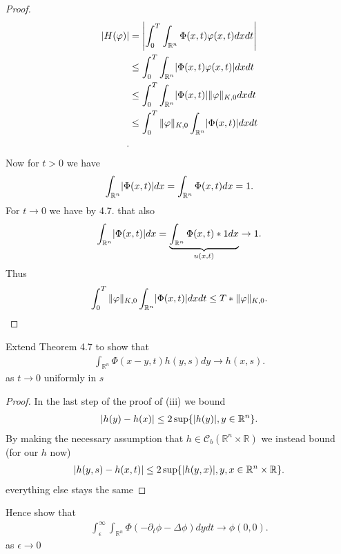 \begin{proof}
 \begin{align*}
   \abs{H(\phi )}  &= \abs*{\int_{0}^{T}  \int_{\mathbb{R}^{n} }\Phi(x,t)\phi(x,t) dx dt}\\
                  &\le \int_{0}^{T}  \int_{\mathbb{R}^{n} }\abs{\Phi(x,t)\phi(x,t)} dx dt\\
                  &\le \int_{0}^{T}  \int_{\mathbb{R}^{n} }\abs{\Phi(x,t)}\|\phi \|_{K,0} dx dt\\
                  &\le \int_{0}^{T} \|\phi \|_{K,0} \int_{\mathbb{R}^{n} }\abs{\Phi(x,t)} dx dt\\
 .\end{align*} 
 Now for $t>0$ we have 
 \begin{align*}
   \int_{\mathbb{R}^{n} } \abs{\Phi(x,t)} dx  =  \int_{\mathbb{R}^{n} } \Phi(x,t) dx  = 1
 .\end{align*}
 For $t\to 0$ we have by 4.7. that also
 \begin{align*}
   \int_{\mathbb{R}^{n} } \abs{\Phi(x,t)} dx  =  \underbrace{\int_{\mathbb{R}^{n} } \Phi(x,t)*1 dx }_{u(x,t)} \to 1
 .\end{align*}
 Thus 
 \begin{align*}
   \int_{0}^{T} \|\phi \|_{K,0} \int_{\mathbb{R}^{n} }\abs{\Phi(x,t)} dx dt \le T*\|\phi \|_{K,0} 
 .\end{align*}
\end{proof}
\begin{exercise}[e]
 Extend Theorem 4.7  to show that 
 \begin{align*}
   \int_{\mathbb{R}^{n} }\Phi(x-y,t)h(y,s)dy \to h(x,s)
 .\end{align*}
 as $t\to 0$ uniformly in $s$
\end{exercise}
\begin{proof}
  In the last step of the proof of (iii) we bound 
  \begin{align*}
    \abs{h(y)-h(x)} \le 2 \sup \{\abs{h(y)} , y \in  \mathbb{R}^{n} \}
  .\end{align*}
  By making the necessary assumption that $h \in  \mathcal{C}_b(\mathbb{R}^{n} \times  \mathbb{R})$ we instead bound (for our $h$ now)
    \begin{align*}
    \abs{h(y,s)-h(x,t)} \le 2 \sup \{\abs{h(y,x)} , y,x \in  \mathbb{R}^{n}\times \mathbb{R} \}
  .\end{align*}
  everything else stays the same 
  \end{proof}
  \begin{exercise}[f]
   Hence show that 
   \begin{align*}
     \int_{\epsilon}^{\infty} \int_{\mathbb{R}^{n} }\Phi(-\partial_t \phi  - \Delta \phi )dydt \to \phi(0,0)
   .\end{align*}
   as $\epsilon \to 0$
  \end{exercise}
